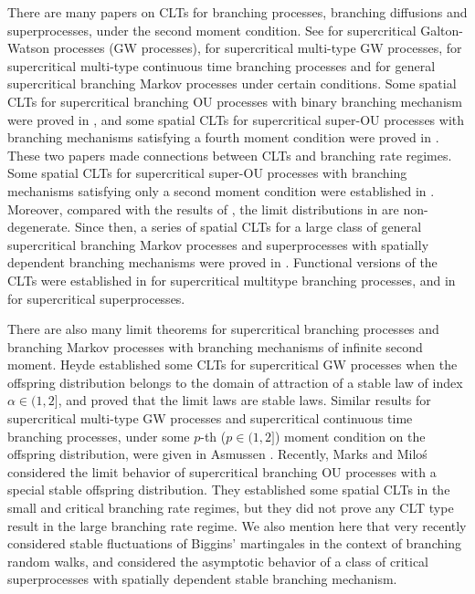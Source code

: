 \documentclass[EJP]{ejpecp} %
\begin{document}
	There are many papers on CLTs for branching processes, branching diffusions
	and superprocesses, under the second moment condition.
	See \cite{Heyde1970A-rate, HeydeBrown1871An-invariance, HeydeLeslie1971Improved} for supercritical Galton-Watson processes (GW processes), \cite{KestenStigum1966Additional,KestenStigum1966A-limit} for supercritical multi-type GW processes, \cite{Athreya1969Limit,Athreya1969LimitB,Athreya1971Some} for supercritical multi-type continuous time branching processes and \cite{AsmussenHering1983Branching} for general supercritical branching Markov processes under certain conditions.
	Some spatial CLTs for supercritical branching OU processes with binary branching mechanism were proved
	in \cite{AdamczakMilos2015CLT}, and some
	spatial CLTs for supercritical super-OU processes with branching mechanisms satisfying a fourth moment condition were proved in \cite{Milos2012Spatial}.
	These two papers made connections between CLTs and branching rate regimes.
	Some spatial CLTs  for supercritical super-OU  processes with branching mechanisms satisfying only a second moment condition were established in \cite{RenSongZhang2014Central}.
	Moreover, compared with the results of \cite{AdamczakMilos2015CLT,Milos2012Spatial}, the limit distributions in \cite{RenSongZhang2014Central} are non-degenerate.
	Since then, a series of spatial CLTs for a large class of general supercritical branching Markov processes and superprocesses with spatially dependent branching mechanisms were proved in \cite{RenSongZhang2014CentralB,RenSongZhang2015Central,RenSongZhang2017Central}.
    Functional versions of the CLTs were established in \cite{Janson2004Functional}
	for supercritical multitype branching processes, and in \cite{RenSongZhang2017Functional} for supercritical superprocesses.

There are also many limit theorems for supercritical branching processes and branching Markov processes with branching mechanisms of infinite second moment.
 Heyde \cite{Heyde1971Some} established some  CLTs for supercritical GW processes when the offspring distribution belongs to the domain of attraction of a stable law of index $\alpha\in (1, 2]$, and proved that the limit laws are stable laws.
	Similar results  for supercritical multi-type GW processes and supercritical continuous time branching processes, under some $p$-th ($p\in(1,2]$) moment condition on the offspring distribution, were given in Asmussen \cite{Asmussen76Convergence}.
	Recently, Marks and Milo\'s \cite{MarksMilos2018CLT} considered the limit behavior of supercritical branching OU processes with a special stable offspring distribution.
	They established some spatial CLTs in the small and critical branching rate regimes, but they did not prove any CLT type result in the large branching rate regime.
	We also mention here that very recently \cite{IksanovKoleskoMeiners2018Stable-like} considered stable fluctuations of Biggins' martingales in the context of
	branching random walks, and \cite{RenSongSun2018Limit} considered
	the asymptotic behavior of a class of critical superprocesses with spatially dependent stable branching mechanism.
\end{document}

